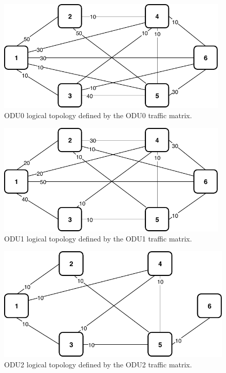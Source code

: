 \begin{figure}[h!]
\centering
\includegraphics[width=11cm]{sdf/ilp/translucent_protection/figures/logical_topology_ODU0_medium}
\caption{ODU0 logical topology defined by the ODU0 traffic matrix.}
\label{logical3_ODU0_protectionmedium}
\end{figure}

\begin{figure}[h!]
\centering
\includegraphics[width=11cm]{sdf/ilp/translucent_protection/figures/logical_topology_ODU1_medium}
\caption{ODU1 logical topology defined by the ODU1 traffic matrix.}
\label{logical3_ODU1_protectionmedium}
\end{figure}
\newpage
\begin{figure}[h!]
\centering
\includegraphics[width=12cm]{sdf/ilp/translucent_protection/figures/logical_topology_ODU2_medium}
\caption{ODU2 logical topology defined by the ODU2 traffic matrix.}
\label{logical3_ODU2_protectionmedium}
\end{figure}

